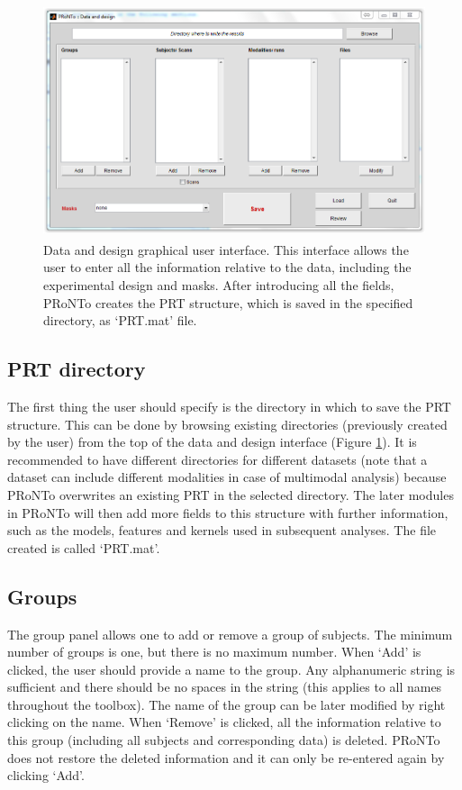 \begin{figure}[!h]
  \begin{center}
      \includegraphics[height=2.7in]{images/Figure2.png}
   \caption{Data and design graphical user interface. This interface allows the user to enter all the information relative to the data, including the experimental design and masks. After introducing all the fields, PRoNTo creates the PRT structure, which is saved in the specified directory, as `PRT.mat' file.}
    \label{Fig2.2}
  \end{center}
\end{figure}

\subsection{PRT directory}

The first thing the user should specify is the directory in which to save the PRT structure. This can be done by browsing existing directories (previously created by the user) from the top of the data and design interface (Figure \ref{Fig2.2}). It is recommended to have different directories for different datasets (note that a dataset can include different modalities in case of multimodal analysis) because PRoNTo overwrites an existing PRT in the selected directory. The later modules in PRoNTo will then add more fields to this structure with further information, such as the models, features and kernels used in subsequent analyses. The file created is called `PRT.mat'.

\subsection{Groups}

The group panel allows one to add or remove a group of subjects. The minimum number of groups is one, but there is no maximum number. When `Add' is clicked, the user should provide a name to the group. Any alphanumeric string is sufficient and there should be no spaces in the string (this applies to all names throughout the toolbox). The name of the group can be later modified by right clicking on the name. When `Remove' is clicked, all the information relative to this group (including all subjects and corresponding data) is deleted. PRoNTo does not restore the deleted information and it can only be re-entered again by clicking `Add'.

